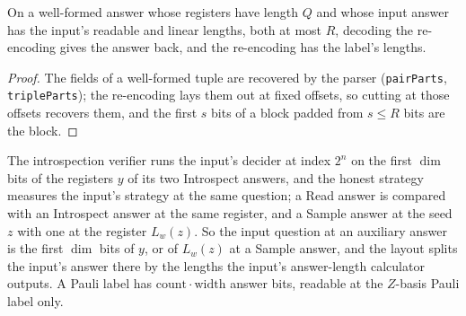 \begin{lemma}
\label{lem:intro-layout}
\leanok
On a well-formed answer whose registers have length $Q$ and whose input answer has the input's
readable and linear lengths, both at most $R$, decoding the re-encoding gives the answer back,
and the re-encoding has the label's lengths.
\end{lemma}

\begin{proof}
\leanok
The fields of a well-formed tuple are recovered by the parser (\texttt{pairParts},
\texttt{tripleParts}); the re-encoding lays them out at fixed offsets, so cutting at those offsets
recovers them, and the first $s$ bits of a block padded from $s \le R$ bits are the block.
\end{proof}

\begin{definition}
\label{def:intro-source}
\leanok
The introspection verifier runs the input's decider at index $2^n$ on the first
$\dim$ bits of the registers $y$ of its two Introspect answers, and the honest strategy measures
the input's strategy at the same question; a Read answer is compared with an Introspect answer at
the same register, and a Sample answer at the seed $z$ with one at the register $L_w(z)$. So the
input question at an auxiliary answer is the first $\dim$ bits of $y$, or of $L_w(z)$ at a
Sample answer, and the layout splits the input's answer there by the lengths the input's
answer-length calculator outputs. A Pauli label has $\mathrm{count} \cdot \mathrm{width}$
answer bits, readable at the $Z$-basis Pauli label only.
\end{definition}

